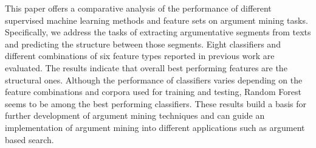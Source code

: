 This paper offers a comparative analysis of the performance of different supervised machine learning methods and feature sets on argument mining tasks. Specifically, we address the tasks of extracting argumentative segments from texts and predicting the structure between those segments. Eight classifiers and different combinations of six feature types reported in previous work are evaluated. The results indicate that overall best performing features are the structural ones. Although the performance of classifiers varies depending on the feature combinations and corpora used for training and testing, Random Forest seems to be among the best performing classifiers. These results build a basis for further development of argument mining techniques and can guide an implementation of argument mining into different applications such as argument based search.
